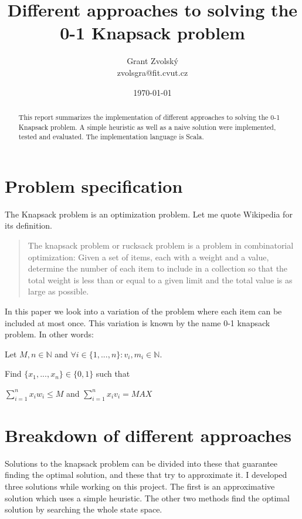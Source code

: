 \documentclass[a4paper,10pt,twocolumn]{article}
\title{Different approaches to solving the 0-1 Knapsack problem}
\date{\today}
\author{Grant Zvolský \\ zvolsgra@fit.cvut.cz}
\begin{document}
\maketitle
\begin{abstract}
This report summarizes the implementation of different approaches to solving the 0-1 Knapsack problem. A simple
heuristic as well as a naive solution were implemented, tested and evaluated. The implementation language is Scala.
\end{abstract}

\section{Problem specification} %
The Knapsack problem is an optimization problem. Let me quote Wikipedia for its definition.

\begin{quote}
The knapsack problem or rucksack problem is a problem in combinatorial optimization:
Given a set of items, each with a weight and a value, determine the number of each item
to include in a collection so that the total weight is less than or equal to a given limit
and the total value is as large as possible.\cite{wikiKnapsack}
\end{quote}

In this paper we look into a variation of the problem where each item can be included
at most once. This variation is known by the name 0-1 knapsack problem. In other words:

Let $M, n\in\mathbb{N}$ and $\forall i\in\{1, ..., n\}:v_i, m_i\in\mathbb{N}$.

Find $\{x_1, ..., x_n\}\in\{0, 1\}$
such that

\vspace{0.4em}
{\centering
$\sum_{i=1}^{n} x_i w_i \le M$ \quad and \quad $\sum_{i=1}^{n} x_i v_i = MAX$

}

\section{Breakdown of different approaches} %
Solutions to the knapsack problem can be divided into these that guarantee finding the optimal solution, and these that
try to approximate it. I developed three solutions while working on this project. The first is an approximative solution
which uses a simple heuristic. The other two methods find the optimal solution by searching the whole state space.
\end{document}
